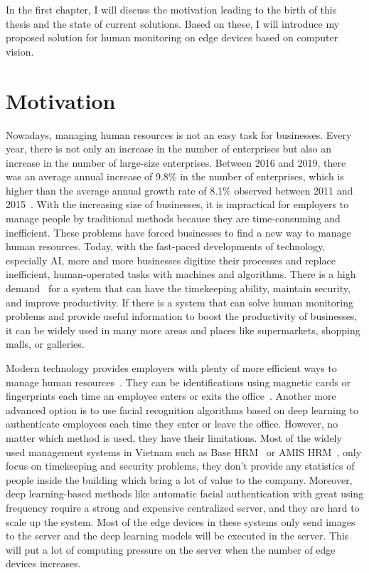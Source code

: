 \documentclass[../main.tex]{subfiles}
\begin{document}
In the first chapter, I will discuss the motivation leading to the birth of this thesis and the state of current solutions. Based on these, I will introduce my proposed solution for human monitoring on edge devices based on computer vision.


\section{Motivation}
\label{sec:motivation}
Nowadays, managing human resources is not an easy task for businesses. Every year, there is not only an increase in the number of enterprises but also an increase in the number of large-size enterprises. Between 2016 and 2019, there was an average annual increase of 9.8\% in the number of enterprises, which is higher than the average annual growth rate of 8.1\% observed between 2011 and 2015~\cite{so_luong_doanh_nghiep}. With the increasing size of businesses, it is impractical for employers to manage people by traditional methods because they are time-consuming and inefficient. These problems have forced businesses to find a new way to manage human resources. Today, with the fast-paced developments of technology, especially AI, more and more businesses digitize their processes and replace inefficient, human-operated tasks with machines and algorithms. There is a high demand~\cite{demand} for a system that can have the timekeeping ability, maintain security, and improve productivity. If there is a system that can solve human monitoring problems and provide useful information to boost the productivity of businesses, it can be widely used in many more areas and places like supermarkets, shopping malls, or galleries.

Modern technology provides employers with plenty of more efficient ways to manage human resources~\cite{elharrouss2021review}. They can be identifications using magnetic cards or fingerprints each time an employee enters or exits the office~\cite{neves2016biometric}. Another more advanced option is to use facial recognition algorithms based on deep learning to authenticate employees each time they enter or leave the office. However, no matter which method is used, they have their limitations. Most of the widely used management systems in Vietnam such as Base HRM~\cite{basehrm} or AMIS HRM~\cite{amishrm}, only focus on timekeeping and security problems, they don't provide any statistics of people inside the building which bring a lot of value to the company. Moreover, deep learning-based methods like automatic facial authentication with great using frequency require a strong and expensive centralized server, and they are hard to scale up the system. Most of the edge devices in these systems only send images to the server and the deep learning models will be executed in the server. This will put a lot of computing pressure on the server when the number of edge devices increases.
\end{document}
